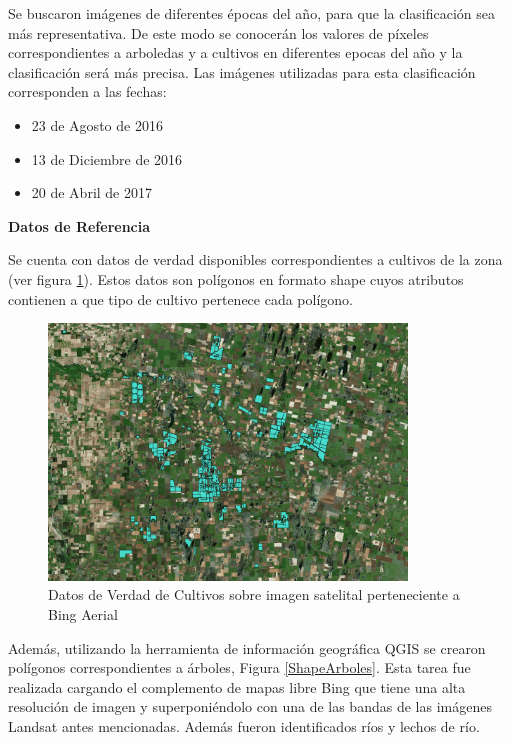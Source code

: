 \documentclass[10pt,a4paper, twoside]{report}
\begin{document}
Se buscaron imágenes de diferentes épocas del año, para que la clasificación sea más representativa. De este modo se conocerán los valores de píxeles correspondientes a arboledas y a cultivos en diferentes epocas del año y la clasificación será más precisa. Las imágenes utilizadas para esta clasificación corresponden a las fechas:

\begin{itemize}	
	\item 23 de Agosto de 2016
	\item 13 de Diciembre de 2016
	\item 20 de Abril de 2017
\end{itemize}

\textbf{Datos de Referencia}

Se cuenta con datos de verdad disponibles correspondientes a cultivos de la zona (ver figura \ref{DatosDeVerdadCultivos}). Estos datos son polígonos en formato shape cuyos atributos contienen a que tipo de cultivo pertenece cada polígono.

\begin{figure}[!htb]
   \centering      
   \includegraphics[width=0.85\textwidth]{imagenes/DatosDeVerdadCultivos.jpg}
 \caption{Datos de Verdad de Cultivos sobre imagen satelital perteneciente a Bing Aerial}
 \label{DatosDeVerdadCultivos}
\end{figure}

Además, utilizando la herramienta de información geográfica QGIS se crearon polígonos correspondientes a árboles, Figura \ref{ShapeArboles}. Esta tarea fue realizada cargando el complemento de mapas libre Bing que tiene una alta resolución de imagen y superponiéndolo con una de las bandas de las imágenes Landsat antes mencionadas. Además fueron identificados ríos y lechos de río.
\end{document}
